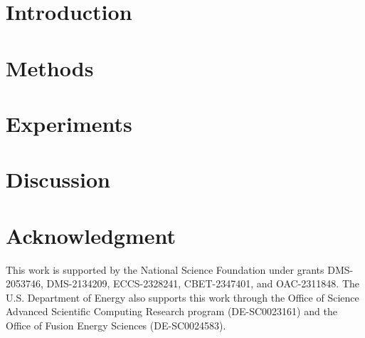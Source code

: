 \documentclass[pdflatex,sn-vancouver,Numbered]{sn-jnl}
\begin{document}
\section{Introduction}\label{sec_intro}


\section{Methods}\label{sec_method}


\section{Experiments}\label{sec_exp}


\section{Discussion}\label{sec_discuss}


\section*{Acknowledgment}
This work is supported by the National Science Foundation under grants DMS-2053746, DMS-2134209, ECCS-2328241, CBET-2347401, and OAC-2311848. The U.S. Department of Energy also supports this work through the Office of Science Advanced Scientific Computing Research program (DE-SC0023161) and the Office of Fusion Energy Sciences (DE-SC0024583).


\end{document}
